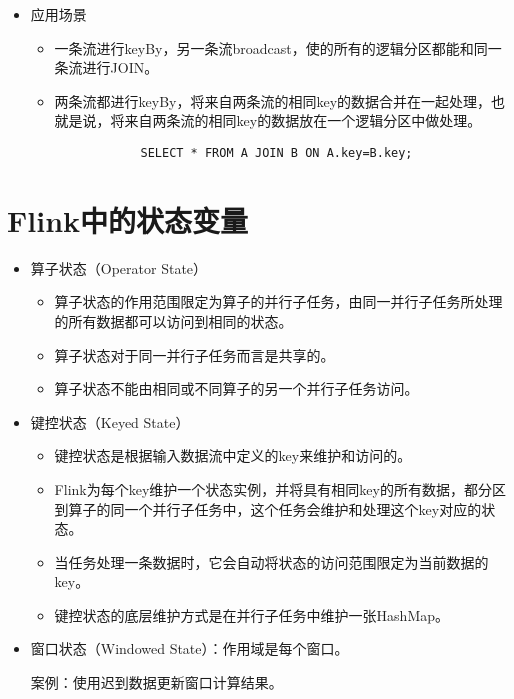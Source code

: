 \documentclass[cn,11pt,chinese]{elegantbook}
\begin{document}
\begin{itemize}
\begin{itemize}
      \item 应用场景
        \begin{itemize}
          \item 一条流进行keyBy，另一条流broadcast，使的所有的逻辑分区都能和同一条流进行JOIN。
          \item 两条流都进行keyBy，将来自两条流的相同key的数据合并在一起处理，也就是说，将来自两条流的相同key的数据放在一个逻辑分区中做处理。
          \begin{verbatim}
            SELECT * FROM A JOIN B ON A.key=B.key;
          \end{verbatim}
        \end{itemize}
    \end{itemize}
\end{itemize}

\chapter{Flink中的状态变量}

\begin{itemize}
  \item 算子状态（Operator State）
  \begin{itemize}
    \item 算子状态的作用范围限定为算子的并行子任务，由同一并行子任务所处理的所有数据都可以访问到相同的状态。
    \item 算子状态对于同一并行子任务而言是共享的。
    \item 算子状态不能由相同或不同算子的另一个并行子任务访问。
  \end{itemize}
  \item 键控状态（Keyed State）
  \begin{itemize}
    \item 键控状态是根据输入数据流中定义的key来维护和访问的。
    \item Flink为每个key维护一个状态实例，并将具有相同key的所有数据，都分区到算子的同一个并行子任务中，这个任务会维护和处理这个key对应的状态。
    \item 当任务处理一条数据时，它会自动将状态的访问范围限定为当前数据的key。
    \item 键控状态的底层维护方式是在并行子任务中维护一张HashMap。
  \end{itemize}
  \item 窗口状态（Windowed State）：作用域是每个窗口。
  
  案例：使用迟到数据更新窗口计算结果。
\end{itemize}
\end{document}
